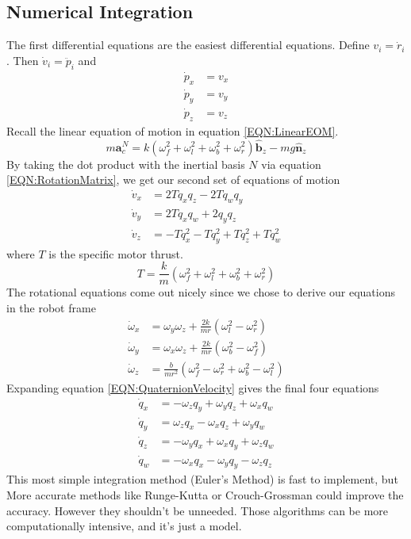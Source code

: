 \documentclass[lettersize,journal]{IEEEtran}
\begin{document}
\subsection{Numerical Integration}
The first differential equations are the easiest differential equations. Define $v_i = \dot{r}_i$. Then $\dot{v}_i=\ddot{p}_i$ and
\begin{align}
	\dot{p}_x &= v_x \\
	\dot{p}_y &= v_y \\
	\dot{p}_z &= v_z
\end{align}
Recall the linear equation of motion in equation \ref{EQN:LinearEOM}.
\begin{equation}
  m\mathbf{a}^N_c = k \left(\omega_f^2 + \omega_l^2 + \omega_b^2 + \omega_r^2\right) \mathbf{\hat{b}}_z - mg \mathbf{\hat{n}}_z \nonumber
\end{equation}
By taking the dot product with the inertial basis $N$ via equation \ref{EQN:RotationMatrix}, we get our second set of equations of motion
\begin{align}
	\dot{v}_x &= 2Tq_xq_z-2Tq_wq_y \\
	\dot{v}_y &= 2Tq_xq_w+2q_yq_z \\
	\dot{v}_z &= -Tq_x^2-Tq_y^2+Tq_z^2+Tq_w^2
\end{align}
where $T$ is the specific motor thrust.
\begin{equation}
	T = \frac{k}{m}\left(\omega_f^2 + \omega_l^2 + \omega_b^2 + \omega_r^2\right)
\end{equation}
The rotational equations come out nicely since we chose to derive our equations in the robot frame
\begin{align}
	\dot{\omega}_x &= \omega_y\omega_z+\frac{2k}{mr}\left(\omega_l^2-\omega_r^2\right) \\
	\dot{\omega}_y &= \omega_x\omega_z+\frac{2k}{mr}\left(\omega_b^2-\omega_f^2\right) \\
	\dot{\omega}_z &= \frac{b}{mr^2}\left(\omega_f^2-\omega_r^2+\omega_b^2-\omega_l^2\right)
\end{align}
Expanding equation \ref{EQN:QuaternionVelocity} gives the final four equations
\begin{align}
	\dot{q}_x &= -\omega_z q_y + \omega_y q_z + \omega_x q_w \\
  \dot{q}_y &= \omega_z q_x - \omega_x q_z + \omega_y q_w  \\
  \dot{q}_z &= -\omega_y q_x + \omega_x q_y + \omega_z q_w \\
  \dot{q}_w &=- \omega_x q_x - \omega_y q_y - \omega_z q_z
\end{align}
This most simple integration method (Euler's Method) is fast to implement, but More accurate methods like Runge-Kutta or Crouch-Grossman could improve the accuracy. However they shouldn't be unneeded. Those algorithms can be more computationally intensive, and it's just a model.
\end{document}
